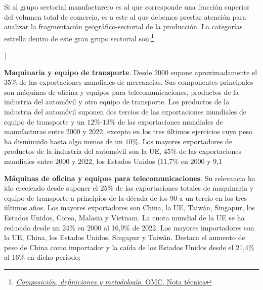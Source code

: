 \documentclass[10pt,a4paper]{article}
\newcounter{alphaitem}
\newenvironment{la}
      {\begin{list}{\alph{alphaitem})}{%
          \usecounter{alphaitem}%
          \setlength{\leftmargin}{1cm}%
          \setlength{\parskip}{3pt}%
          \setlength{\itemsep}{0pt}%
          \setlength{\parsep}{0pt}%
      }}
      {\end{list}}
\begin{document}
Si al grupo sectorial manufacturero es al que corresponde una fracción superior del volumen total de comercio, es a este al que debemos prestar atención para analizar la fragmentación geográfico-sectorial de la producción. La categorías estrella dentro de este gran grupo sectorial son:\footnote{%
    \href{https://www.wto.org/spanish/res_s/booksp_s/wtsr_2022_c4_s.pdf}{\textit{Composición, definiciones y metodología}. OMC, Nota técnica}
} 
\begin{la}
    \item \textbf{Maquinaria y equipo de transporte}. Desde 2000 supone aproximadamente el $35\%$ de las exportaciones mundiales de mercancías. Sus componentes principales son máquinas de oficina y equipos para telecomunicaciones, productos de la industria del automóvil y otro equipo de transporte. Los productos de la industria del automóvil suponen dos tercios de las exportaciones mundiales de equipo de transporte y un $12\%$-$13\%$ de las exportaciones mundiales de manufacturas entre 2000 y 2022, excepto en los tres últimos ejercicios cuyo peso ha disminuido hasta algo menos de un $10\%$. Los mayores exportadores de productos de la industria del automóvil son la UE, $45\%$ de las exportaciones mundiales entre 2000 y 2022, los Estados Unidos (11,7\% en 2000 y 9,1%
    \item \textbf{Máquinas de oficina y equipos para telecomunicaciones}. Su relevancia ha ido creciendo desde suponer el $25\%$ de las exportaciones totales de maquinaria y equipo de transporte a principios de la década de los 90 a un tercio en los tres últimos años. Los mayores exportadores son China, la UE, Taiwán, Singapur, los Estados Unidos, Corea, Malasia y Vietnam. La cuota mundial de la UE se ha reducido desde un 24\% en 2000 al 16,9\% de 2022. Los mayores importadores son la UE, China, los Estados Unidos, Singapur y Taiwán. Destaca el aumento de peso de China como importador y la caída de los Estados Unidos desde el 21,4\% al 16\% en dicho período;
\end{la}
\end{document}
